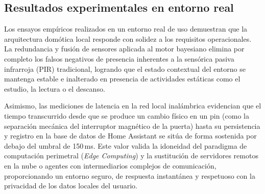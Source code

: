 \subsection{Resultados experimentales en entorno real}
\label{sec:resultados_experimentales}
Los ensayos empíricos realizados en un entorno real de uso demuestran que la arquitectura domótica local responde con solidez a los requisitos operacionales. La redundancia y fusión de sensores aplicada al motor bayesiano elimina por completo los falsos negativos de presencia inherentes a la sensórica pasiva infrarroja (PIR) tradicional, logrando que el estado contextual del entorno se mantenga estable e inalterado en presencia de actividades estáticas como el estudio, la lectura o el descanso.

Asimismo, las mediciones de latencia en la red local inalámbrica evidencian que el tiempo transcurrido desde que se produce un cambio físico en un pin (como la separación mecánica del interruptor magnético de la puerta) hasta su persistencia y registro en la base de datos de Home Assistant se sitúa de forma sostenida por debajo del umbral de 150\,ms. Este valor valida la idoneidad del paradigma de computación perimetral (\textit{Edge Computing}) y la sustitución de servidores remotos en la nube o agentes con intermediarios complejos de comunicación, proporcionando un entorno seguro, de respuesta instantánea y respetuoso con la privacidad de los datos locales del usuario.
